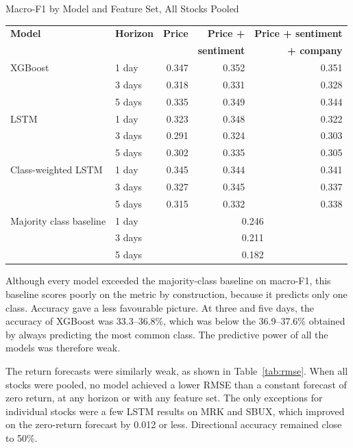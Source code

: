 \begin{utptable}{Macro-F1 by Model and Feature Set, All Stocks Pooled}
\label{tab:ablation-f1}
\begin{tabular}{@{}llrrr@{}}
\toprule
\textbf{Model} & \textbf{Horizon} & \textbf{Price} & \textbf{Price +} & \textbf{Price + sentiment} \\
 & & & \textbf{sentiment} & \textbf{+ company} \\
\midrule
XGBoost & 1 day & 0.347 & 0.352 & 0.351 \\
 & 3 days & 0.318 & 0.331 & 0.328 \\
 & 5 days & 0.335 & 0.349 & 0.344 \\
\midrule
LSTM & 1 day & 0.323 & 0.348 & 0.322 \\
 & 3 days & 0.291 & 0.324 & 0.303 \\
 & 5 days & 0.302 & 0.335 & 0.305 \\
\midrule
Class-weighted LSTM & 1 day & 0.345 & 0.344 & 0.341 \\
 & 3 days & 0.327 & 0.345 & 0.337 \\
 & 5 days & 0.315 & 0.332 & 0.338 \\
\midrule
Majority class baseline & 1 day & \multicolumn{3}{c}{0.246} \\
 & 3 days & \multicolumn{3}{c}{0.211} \\
 & 5 days & \multicolumn{3}{c}{0.182} \\
\bottomrule
\end{tabular}
\end{utptable}

Although every model exceeded the majority-class baseline on macro-F1, this baseline scores poorly on the metric by construction, because it predicts only one class. Accuracy gave a less favourable picture. At three and five days, the accuracy of XGBoost was 33.3--36.8\%, which was below the 36.9--37.6\% obtained by always predicting the most common class. The predictive power of all the models was therefore weak.

The return forecasts were similarly weak, as shown in Table~\ref{tab:rmse}. When all stocks were pooled, no model achieved a lower RMSE than a constant forecast of zero return, at any horizon or with any feature set. The only exceptions for individual stocks were a few LSTM results on MRK and SBUX, which improved on the zero-return forecast by 0.012 or less. Directional accuracy remained close to 50\%.


